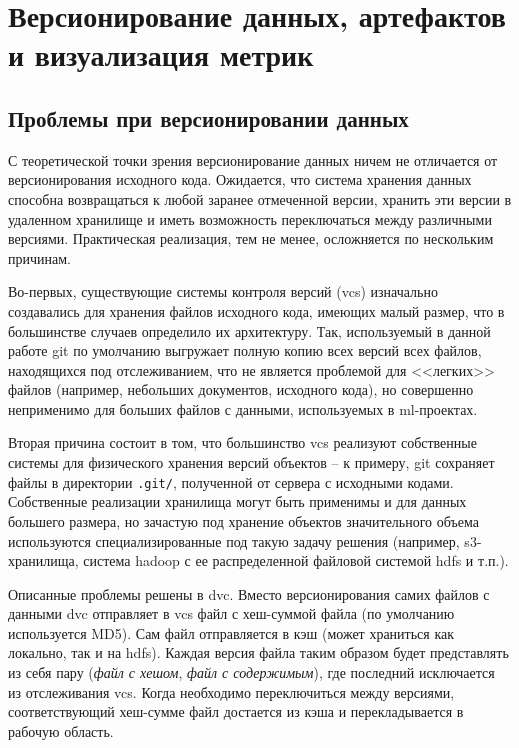 \section{Версионирование данных, артефактов и визуализация метрик}
\label{sec:dvc}

\subsection{Проблемы при версионировании данных}
\label{sec:dvc-versioning-problems}
С теоретической точки зрения версионирование данных ничем не отличается от версионирования исходного кода.
Ожидается, что система хранения данных способна возвращаться к любой заранее отмеченной версии, хранить эти версии в удаленном хранилище и иметь возможность переключаться между различными версиями.
Практическая реализация, тем не менее, осложняется по нескольким причинам.

Во-первых, существующие системы контроля версий (\acrlong{vcs}) изначально создавались для хранения файлов исходного кода, имеющих малый размер, что в большинстве случаев определило их архитектуру.
Так, используемый в данной работе \gls{git} по умолчанию выгружает полную копию всех версий всех файлов, находящихся под отслеживанием, что не является проблемой для <<легких>> файлов (например, небольших документов, исходного кода), но совершенно неприменимо для больших файлов с данными, используемых в \acrshort{ml}-проектах.

Вторая причина состоит в том, что большинство \acrshort{vcs} реализуют собственные системы для физического хранения версий объектов -- к примеру, \gls{git} сохраняет файлы в директории \texttt{.git/}, полученной от сервера с исходными кодами.
Собственные реализации хранилища могут быть применимы и для данных большего размера, но зачастую под хранение объектов значительного объема используются специализированные под такую задачу решения (например, \gls{s3}-хранилища, система \gls{hadoop} с ее распределенной файловой системой \gls{hdfs} и т.п.).

Описанные проблемы решены в \gls{dvc}.
Вместо версионирования самих файлов с данными \gls{dvc} отправляет в \acrshort{vcs} файл с хеш-суммой файла (по умолчанию используется MD5).
Сам файл отправляется в кэш (может храниться как локально, так и на \gls{hdfs}).
Каждая версия файла таким образом будет представлять из себя пару (\textit{файл с хешом}, \textit{файл с содержимым}), где последний исключается из отслеживания \gls{vcs}.
Когда необходимо переключиться между версиями, соответствующий хеш-сумме файл достается из кэша и перекладывается в рабочую область.

